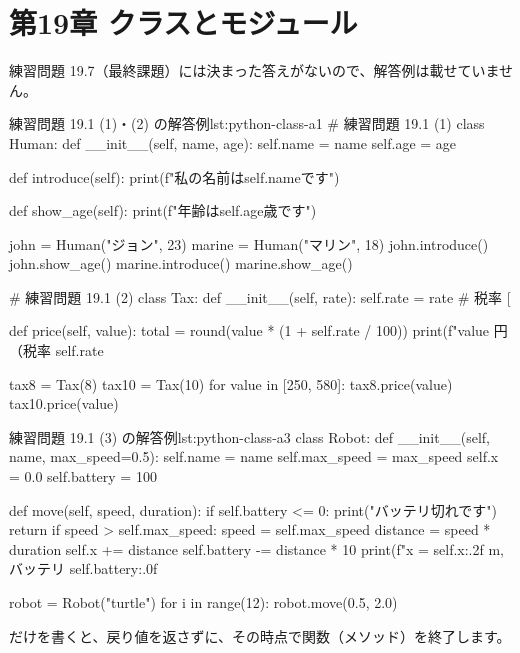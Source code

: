 \section{第19章 クラスとモジュール}
\label{sec:python-class-answers}

練習問題 19.7（最終課題）には決まった答えがないので、解答例は載せていません。

\begin{codelisting}[style=python]{練習問題 19.1 (1)・(2) の解答例}{lst:python-class-a1}
# 練習問題 19.1 (1)
class Human:
    def __init__(self, name, age):
        self.name = name
        self.age = age

    def introduce(self):
        print(f"私の名前は{self.name}です")

    def show_age(self):
        print(f"年齢は{self.age}歳です")


john = Human("ジョン", 23)
marine = Human("マリン", 18)
john.introduce()
john.show_age()
marine.introduce()
marine.show_age()


# 練習問題 19.1 (2)
class Tax:
    def __init__(self, rate):
        self.rate = rate   # 税率 [%

    def price(self, value):
        total = round(value * (1 + self.rate / 100))
        print(f"{value} 円（税率 {self.rate}%


tax8 = Tax(8)
tax10 = Tax(10)
for value in [250, 580]:
    tax8.price(value)
    tax10.price(value)
\end{codelisting}

\begin{codelisting}[style=python]{練習問題 19.1 (3) の解答例}{lst:python-class-a3}
class Robot:
    def __init__(self, name, max_speed=0.5):
        self.name = name
        self.max_speed = max_speed
        self.x = 0.0
        self.battery = 100

    def move(self, speed, duration):
        if self.battery <= 0:
            print("バッテリ切れです")
            return
        if speed > self.max_speed:
            speed = self.max_speed
        distance = speed * duration
        self.x += distance
        self.battery -= distance * 10
        print(f"x = {self.x:.2f} m, バッテリ {self.battery:.0f}%


robot = Robot("turtle")
for i in range(12):
    robot.move(0.5, 2.0)
\end{codelisting}

 だけを書くと、戻り値を返さずに、その時点で関数（メソッド）を終了します。

